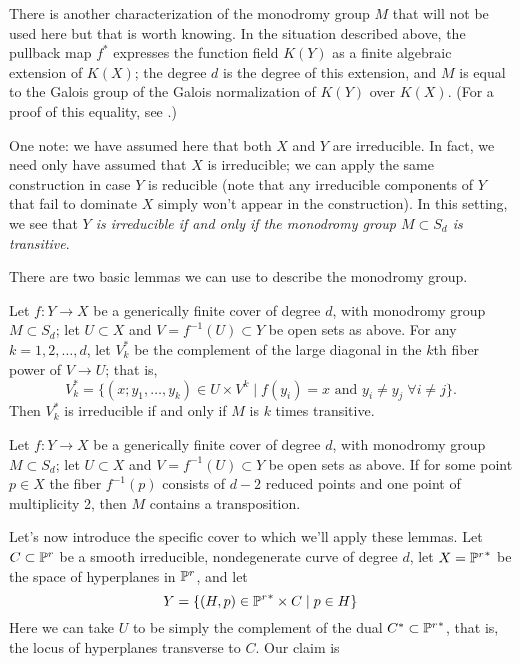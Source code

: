 \begin{fact}
There is another characterization of the monodromy group $M$ that will not be used here but that is worth knowing. In the situation described above, the pullback map $f^*$ expresses the function field $K(Y)$ as a finite algebraic extension of $K(X)$; the degree $d$ is the degree of this extension, and $M$ is equal to the Galois group of the Galois normalization of $K(Y)$ over $K(X)$. (For a proof of this equality, see \cite{Harris}.)
\end{fact}

One note: we have assumed here that both $X$ and $Y$ are irreducible. In fact, we need only have assumed that $X$ is irreducible; we can apply the same construction in case $Y$ is reducible (note that any irreducible components of $Y$ that fail to dominate $X$ simply won't appear in the construction). In this setting, we see that \emph{$Y$ is irreducible if and only if the monodromy group $M \subset S_d$ is transitive}.


There are two basic lemmas we can use to describe the monodromy group.

\begin{lemma}\label{transitivity lemma}
Let $f : Y \to X$ be a generically finite cover of degree $d$, with  monodromy group $M \subset S_d$; let $U \subset X$ and $V = f^{-1}(U) \subset Y$ be open sets as above. For any $k = 1,2,\dots,d$, let $V_k^*$ be the complement of the large diagonal in the $k$th fiber power of $V \to U$; that is,
$$
V_k^* = \{ (x; y_1,\dots, y_k) \in U \times V^k \mid f(y_i) = x \text{ and } y_i \neq y_j \; \forall i \neq j\}.
$$
Then $V_k^*$ is irreducible if and only if $M$ is $k$ times transitive.
\end{lemma}


\begin{lemma}\label{transposition lemma}
Let $f : Y \to X$ be a generically finite cover of degree $d$, with  monodromy group $M \subset S_d$; let $U \subset X$ and $V = f^{-1}(U) \subset Y$ be open sets as above. If for some point $p \in X$ the fiber $f^{-1}(p)$ consists of $d-2$ reduced points and one point of multiplicity 2, then $M$ contains a transposition.
\end{lemma}

Let's now introduce the specific cover to which we'll apply these lemmas. Let $C \subset {\mathbb P}^r$ be a smooth irreducible, nondegenerate curve of degree $d$, let $X = {{\mathbb P}^r}^*$ be the space of hyperplanes in ${\mathbb P}^r$, and let
$$
Y = \{ (H, p) \in {{\mathbb P}^r}^* \times C \mid p \in H \}
$$
Here we can take $U$ to be simply the complement of the dual $C^* \subset {{\mathbb P}^r}^*$, that is, the locus of hyperplanes transverse to $C$. Our claim is

